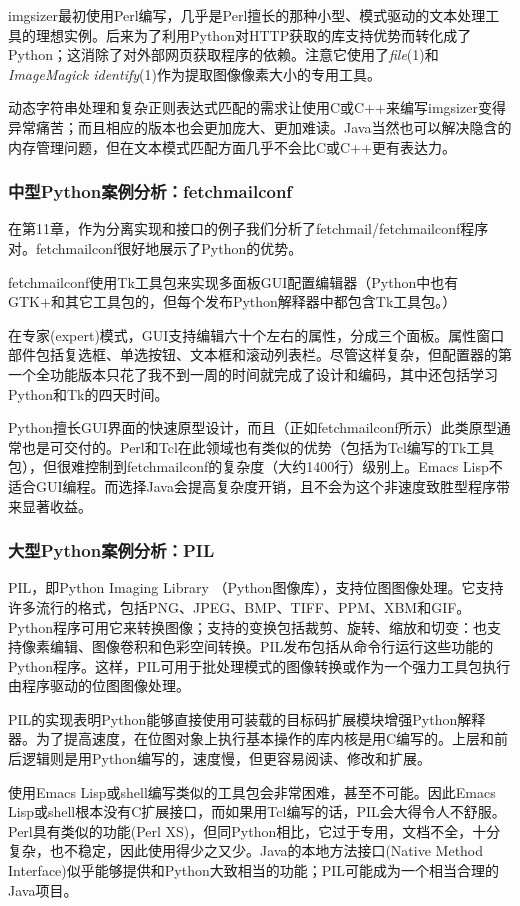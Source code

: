 \documentclass[12pt,oneside]{book}
\begin{document}
\begin{common-format}
imgsizer最初使用Perl编写，几乎是Perl擅长的那种小型、模式驱动的文本处理工具的理想实例。后来为了利用Python对HTTP获取的库支持优势而转化成了Python；这消除了对外部网页获取程序的依赖。注意它使用了\textit{file}(1)和\textit{ImageMagick identify}(1)作为提取图像像素大小的专用工具。

动态字符串处理和复杂正则表达式匹配的需求让使用C或C++来编写imgsizer变得异常痛苦；而且相应的版本也会更加庞大、更加难读。Java当然也可以解决隐含的内存管理问题，但在文本模式匹配方面几乎不会比C或C++更有表达力。

\subsubsection{中型Python案例分析：fetchmailconf}
在第11章，作为分离实现和接口的例子我们分析了fetchmail/fetchmailconf程序对。fetchmailconf很好地展示了Python的优势。

fetchmailconf使用Tk工具包来实现多面板GUI配置编辑器（Python中也有GTK+和其它工具包的，但每个发布Python解释器中都包含Tk工具包。）

在专家(expert)模式，GUI支持编辑六十个左右的属性，分成三个面板。属性窗口部件包括复选框、单选按钮、文本框和滚动列表栏。尽管这样复杂，但配置器的第一个全功能版本只花了我不到一周的时间就完成了设计和编码，其中还包括学习Python和Tk的四天时间。

Python擅长GUI界面的快速原型设计，而且（正如fetchmailconf所示）此类原型通常也是可交付的。Perl和Tcl在此领域也有类似的优势（包括为Tcl编写的Tk工具包），但很难控制到fetchmailconf的复杂度（大约1400行）级别上。Emacs Lisp不适合GUI编程。而选择Java会提高复杂度开销，且不会为这个非速度致胜型程序带来显著收益。

\subsubsection{大型Python案例分析：PIL}
PIL，即Python Imaging Library （Python图像库），支持位图图像处理。它支持许多流行的格式，包括PNG、JPEG、BMP、TIFF、PPM、XBM和GIF。Python程序可用它来转换图像；支持的变换包括裁剪、旋转、缩放和切变：也支持像素编辑、图像卷积和色彩空间转换。PIL发布包括从命令行运行这些功能的Python程序。这样，PIL可用于批处理模式的图像转换或作为一个强力工具包执行由程序驱动的位图图像处理。

PIL的实现表明Python能够直接使用可装载的目标码扩展模块增强Python解释器。为了提高速度，在位图对象上执行基本操作的库内核是用C编写的。上层和前后逻辑则是用Python编写的，速度慢，但更容易阅读、修改和扩展。

使用Emacs Lisp或shell编写类似的工具包会非常困难，甚至不可能。因此Emacs Lisp或shell根本没有C扩展接口，而如果用Tcl编写的话，PIL会大得令人不舒服。Perl具有类似的功能(Perl XS)，但同Python相比，它过于专用，文档不全，十分复杂，也不稳定，因此使用得少之又少。Java的本地方法接口(Native Method Interface)似乎能够提供和Python大致相当的功能；PIL可能成为一个相当合理的Java项目。


\end{common-format}
\end{document}
